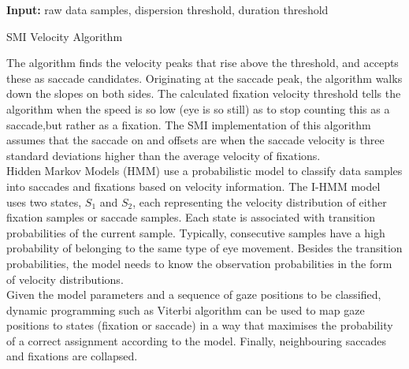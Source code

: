 \documentclass[12pt]{article}
\theoremstyle{definition}
\begin{document}
\begin{algorithm}[H]
\SetAlgoLined
\textbf{Input:} raw data samples, dispersion threshold, duration threshold\\
 \caption{SMI Velocity Algorithm}
\end{algorithm}

The algorithm finds the velocity peaks that rise above the threshold, and accepts these as saccade candidates. Originating at the saccade peak, the algorithm walks down the slopes on both sides. The calculated fixation velocity threshold tells the algorithm when the speed is so low (eye is so still) as to stop counting this as a saccade,but rather as a fixation. The SMI implementation of this algorithm assumes that the saccade on and offsets are when the saccade velocity is three standard deviations higher than the average velocity of fixations.\\

Hidden Markov Models (HMM) use a probabilistic model to classify data samples into saccades and fixations based on velocity information. The I-HMM model uses two states, $S_1$ and $S_2$, each representing the velocity distribution of either fixation samples or saccade samples. Each state is associated with transition probabilities of the current sample. Typically, consecutive samples have a high probability of belonging to the same type of eye movement. Besides the transition probabilities, the model needs to know the observation probabilities in the form of velocity distributions.\\

Given the model parameters and a sequence of gaze positions to be classified, dynamic programming such as Viterbi algorithm can be used to map gaze positions to states (fixation or saccade) in a way that maximises the probability of a correct assignment according to the model. Finally, neighbouring saccades and fixations are collapsed.
\end{document}
